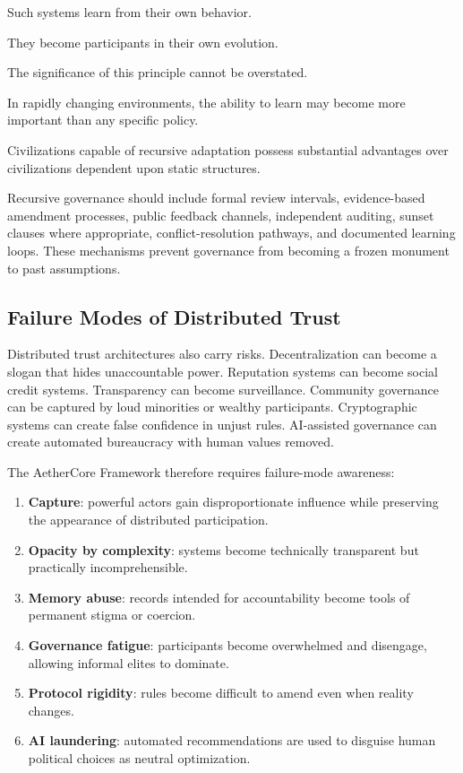 \documentclass[12pt]{article}
\begin{document}
Such systems learn from their own behavior.

They become participants in their own evolution.

The significance of this principle cannot be overstated.

In rapidly changing environments, the ability to learn may become more important than any specific policy.

Civilizations capable of recursive adaptation possess substantial advantages over civilizations dependent upon static structures.

Recursive governance should include formal review intervals, evidence-based amendment processes, public feedback channels, independent auditing, sunset clauses where appropriate, conflict-resolution pathways, and documented learning loops. These mechanisms prevent governance from becoming a frozen monument to past assumptions.

\subsection{Failure Modes of Distributed Trust}

Distributed trust architectures also carry risks. Decentralization can become a slogan that hides unaccountable power. Reputation systems can become social credit systems. Transparency can become surveillance. Community governance can be captured by loud minorities or wealthy participants. Cryptographic systems can create false confidence in unjust rules. AI-assisted governance can create automated bureaucracy with human values removed.

The AetherCore Framework therefore requires failure-mode awareness:

\begin{enumerate}
  \item \textbf{Capture}: powerful actors gain disproportionate influence while preserving the appearance of distributed participation.
  \item \textbf{Opacity by complexity}: systems become technically transparent but practically incomprehensible.
  \item \textbf{Memory abuse}: records intended for accountability become tools of permanent stigma or coercion.
  \item \textbf{Governance fatigue}: participants become overwhelmed and disengage, allowing informal elites to dominate.
  \item \textbf{Protocol rigidity}: rules become difficult to amend even when reality changes.
  \item \textbf{AI laundering}: automated recommendations are used to disguise human political choices as neutral optimization.
\end{enumerate}
\end{document}
